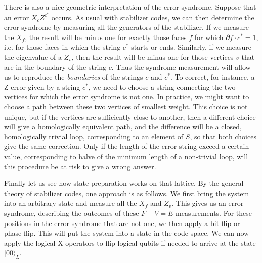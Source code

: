 \documentclass[a4paper, draft]{article}
\theoremstyle{own}
\theoremstyle{remark}
\begin{document}
There is also a nice geometric interpretation of the error syndrome. Suppose that an error $X_c Z^{c^*}$ occurs. As usual with stabilizer codes, we can then determine the error syndrome by measuring all the generators of the stabilizer. If we measure the $X_f$, the result will be minus one for exactly those faces $f$ for which $\partial f \cdot c^* = 1$, i.e. for those faces in which the string $c^*$ starts or ends. Similarly, if we measure the eigenvalue of a $Z_v$, then the result will be minus one for those vertices $v$ that are in the boundary of the string $c$. Thus the syndrome measurement will allow us to reproduce the \emph{boundaries} of the strings $c$ and $c^*$. To correct, for instance, a Z-error given by a string $c^*$, we need to choose a string connecting the two vertices for which the error syndrome is not one. In practice, we might want to choose a path between these two vertices of smallest weight. This choice is not unique, but if the vertices are sufficiently close to another, then a different choice will give a homologically equivalent path, and the difference will be a closed, homologically trivial loop, corresponding to an element of $S$, so that both choices give the same correction. Only if the length of the error string exceed a certain value, corresponding to halve of the minimum length of a non-trivial loop, will this procedure be at risk to give a wrong answer. 

Finally let us see how state preparation works on that lattice. By the general theory of stabilizer codes, one approach is as follows. We first bring the system into an arbitrary state and measure all the $X_f$ and $Z_v$. This gives us an error syndrome, describing the outcomes of these $F + V = E$ measurements. For these positions in the error syndrome that are not one, we then apply a bit flip or phase flip. This will put the system into a state in the code space. We can now apply the logical X-operators to flip logical qubits if needed to arrive at the state $|0 0\rangle_L$. 




\end{document}
